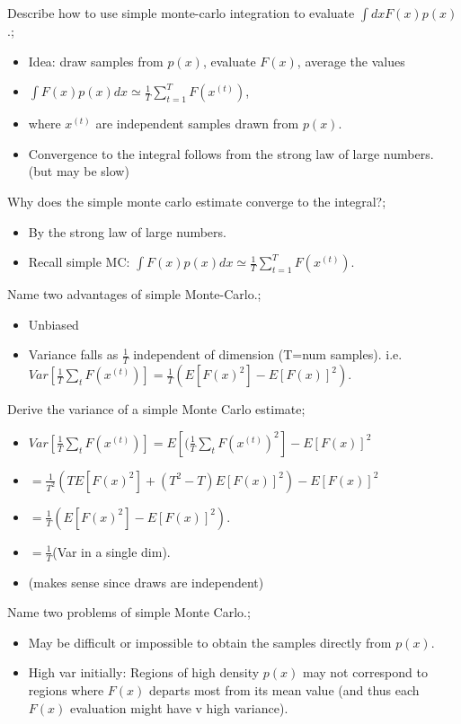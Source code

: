 \documentclass{article}
\begin{document}
Describe how to use simple monte-carlo integration to evaluate $\int dx F(x) p(x)$.; \begin{itemize} \item Idea: draw samples from $p(x)$, evaluate $F(x)$, average the values \item $\int F(x)p(x)dx \simeq \frac{1}{T}\sum_{t=1}^T F(x^{(t)})$, \item where $x^({t})$ are independent samples drawn from $p(x)$. \item Convergence to the integral follows from the strong law of large numbers. (but may be slow) \end{itemize}

Why does the simple monte carlo estimate converge to the integral?; \begin{itemize} \item By the strong law of large numbers. \item Recall simple MC: $\int F(x)p(x)dx \simeq \frac{1}{T}\sum_{t=1}^T F(x^{(t)})$. \end{itemize} 

Name two advantages of simple Monte-Carlo.; \begin{itemize} \item Unbiased \item Variance falls as $\frac{1}{T}$ independent of dimension (T=num samples). i.e. $Var[\frac{1}{T}\sum_t F(x^{(t)})] = \frac{1}{T}(E[F(x)^2] - E[F(x)]^2)$. \end{itemize} 

Derive the variance of a simple Monte Carlo estimate; \begin{itemize} \item $Var[\frac{1}{T}\sum_t F(x^{(t)})] = E[(\frac{1}{T}\sum_t F(x^{(t)})^2] - E[F(x)]^2$ \item $=\frac{1}{T^2}(TE[F(x)^2]+(T^2-T)E[F(x)]^2) - E[F(x)]^2$ \item $= \frac{1}{T}(E[F(x)^2] - E[F(x)]^2)$. \item $=\frac{1}{T}$(Var in a single dim). \item (makes sense since draws are independent) \end{itemize}

Name two problems of simple Monte Carlo.; \begin{itemize} \item May be difficult or impossible to obtain the samples directly from $p(x)$. \item High var initially: Regions of high density $p(x)$ may not correspond to regions where $F(x)$ departs most from its mean value (and thus each $F(x)$ evaluation might have v high variance). \end{itemize} 
\end{document}
